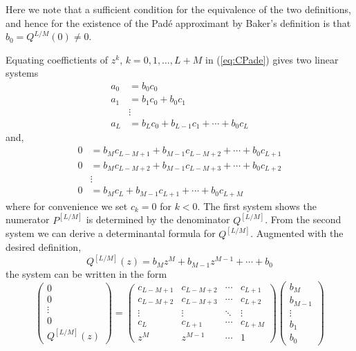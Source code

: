 Here we note that a sufficient condition for the equivalence of the two definitions, and hence for the existence of the Pad\'e approximant by Baker's definition is that $b_0 = Q^{L/M}(0) \neq 0$. 

Equating coeffictients of $z^k$, $k = 0, 1, \ldots, L+M$ in (\ref{eq:CPade}) gives two linear systems
\begin{align*}
  a_0 &= b_0c_0 \\
  a_1 &= b_1c_0 + b_0c_1 \\
  &\vdots \\
  a_L &= b_L c_0 + b_{L-1}c_1 + \cdots + b_0c_L
\end{align*}
and,
\begin{align*}
  0 &= b_{M}c_{L-M+1} + b_{M-1}c_{L-M+2} + \cdots + b_0c_{L+1} \\
  0 &= b_{M}c_{L-M+2} + b_{M-1}c_{L-M+3} + \cdots + b_0c_{L+2} \\
  &\vdots \\
  0 &= b_{M}c_L + b_{M-1}c_{L+1} + \cdots + b_0c_{L+M}
\end{align*}
where for convenience we set $c_k = 0$ for $k < 0$. The first system shows the numerator $P^{[L/M]}$ is determined by the denominator $Q^{[L/M]}$. From the second system we can derive a determinantal formula for $Q^{[L/M]}$. Augmented with the desired definition, 
\[
  Q^{[L/M]}(z) = b_M z^M + b_{M-1}z^{M-1} + \cdots + b_0
\]
the system can be written in the form
\[
  \begin{pmatrix}
    0 \\ 0 \\ \vdots \\ 0 \\ Q^{[L/M]}(z)
  \end{pmatrix}
  =
  \begin{pmatrix}
    c_{L-M+1} & c_{L-M+2} & \cdots & c_{L+1} \\
    c_{L-M+2} & c_{L-M+3} & \cdots & c_{L+2} \\
    \vdots & \vdots & \ddots & \vdots \\
    c_{L} & c_{L+1} & \cdots & c_{L+M} \\
    z^M & z^{M-1} & \cdots & 1
  \end{pmatrix}
  \begin{pmatrix}
    b_M \\ b_{M-1} \\ \vdots \\ b_1 \\ b_0
  \end{pmatrix}
\]
